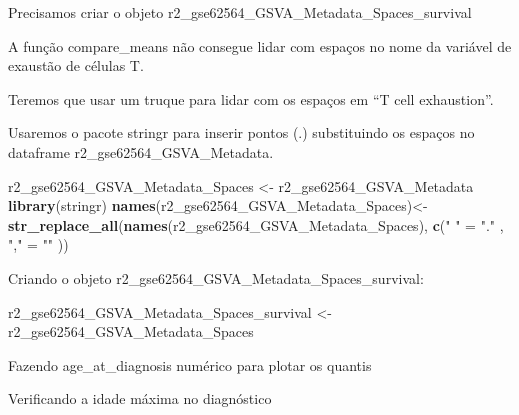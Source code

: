 \documentclass[
]{book}
\newenvironment{Shaded}{\begin{snugshade}}{\end{snugshade}}
\newcommand{\FunctionTok}[1]{\textcolor[rgb]{0.13,0.29,0.53}{\textbf{#1}}}
\newcommand{\NormalTok}[1]{#1}
\newcommand{\OtherTok}[1]{\textcolor[rgb]{0.56,0.35,0.01}{#1}}
\newcommand{\SpecialCharTok}[1]{\textcolor[rgb]{0.81,0.36,0.00}{\textbf{#1}}}
\newcommand{\StringTok}[1]{\textcolor[rgb]{0.31,0.60,0.02}{#1}}
\begin{document}
Precisamos criar o objeto r2\_gse62564\_GSVA\_Metadata\_Spaces\_survival

A função compare\_means não consegue lidar com espaços no nome da variável de exaustão de células T.

Teremos que usar um truque para lidar com os espaços em ``T cell exhaustion''.

Usaremos o pacote stringr para inserir pontos (.) substituindo os espaços no dataframe r2\_gse62564\_GSVA\_Metadata.

\begin{Shaded}
\begin{Highlighting}[]
\NormalTok{r2\_gse62564\_GSVA\_Metadata\_Spaces }\OtherTok{\textless{}{-}}\NormalTok{ r2\_gse62564\_GSVA\_Metadata}
\FunctionTok{library}\NormalTok{(stringr)}
\FunctionTok{names}\NormalTok{(r2\_gse62564\_GSVA\_Metadata\_Spaces)}\OtherTok{\textless{}{-}}\FunctionTok{str\_replace\_all}\NormalTok{(}\FunctionTok{names}\NormalTok{(r2\_gse62564\_GSVA\_Metadata\_Spaces), }\FunctionTok{c}\NormalTok{(}\StringTok{" "} \OtherTok{=} \StringTok{"."}\NormalTok{ , }\StringTok{","} \OtherTok{=} \StringTok{""}\NormalTok{ ))}
\end{Highlighting}
\end{Shaded}

Criando o objeto r2\_gse62564\_GSVA\_Metadata\_Spaces\_survival:

\begin{Shaded}
\begin{Highlighting}[]
\NormalTok{r2\_gse62564\_GSVA\_Metadata\_Spaces\_survival }\OtherTok{\textless{}{-}}\NormalTok{ r2\_gse62564\_GSVA\_Metadata\_Spaces}
\end{Highlighting}
\end{Shaded}

Fazendo age\_at\_diagnosis numérico para plotar os quantis

\begin{Shaded}
\end{Shaded}

Verificando a idade máxima no diagnóstico

\begin{Shaded}
\end{Shaded}
\end{document}
